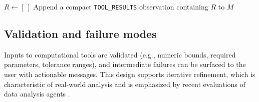 \begin{algorithm}[!ht]
{  $R \leftarrow [\ ]$ \;
  Append a compact \texttt{TOOL\_RESULTS} observation containing $R$ to $M$\;
}
\end{algorithm}

\subsection{Validation and failure modes}
Inputs to computational tools are validated (e.g., numeric bounds, required parameters, tolerance ranges), and intermediate failures can be surfaced to the user with actionable messages.
This design supports iterative refinement, which is characteristic of real-world analysis and is emphasized by recent evaluations of data analysis agents \citep{Zhang2024DSEval,Li2025IDABench}.
